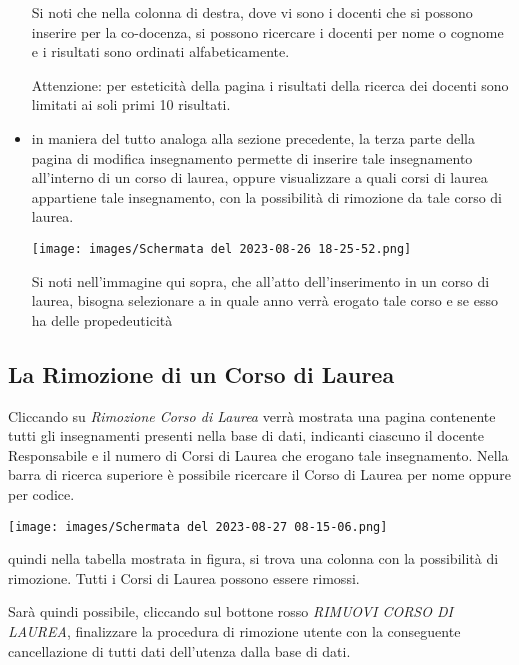 \documentclass{article}
\begin{document}
\begin{itemize}
        Si noti che nella colonna di destra, dove vi sono i docenti che si possono inserire per la co-docenza, si possono ricercare i docenti per nome o cognome e i risultati sono ordinati alfabeticamente.

        Attenzione: per esteticità della pagina i risultati della ricerca dei docenti sono limitati ai soli primi 10 risultati.

        \item in maniera del tutto analoga alla sezione precedente, la terza parte della pagina di modifica insegnamento permette di inserire tale insegnamento all'interno di un corso di laurea, oppure visualizzare a quali corsi di laurea appartiene tale insegnamento, con la possibilità di rimozione da tale corso di laurea.

        \begin{center}
            \texttt{[image: images/Schermata del 2023-08-26 18-25-52.png]}
        \end{center}

        Si noti nell'immagine qui sopra, che all'atto dell'inserimento in un corso di laurea, bisogna selezionare a in quale anno verrà erogato tale corso e se esso ha delle propedeuticità
    \end{itemize}

    \subsection{La Rimozione di un Corso di Laurea}
    Cliccando su \textit{Rimozione Corso di Laurea} verrà mostrata una pagina contenente tutti gli insegnamenti presenti nella base di dati, indicanti ciascuno il docente Responsabile e il numero di Corsi di Laurea che erogano tale insegnamento. Nella barra di ricerca superiore è possibile ricercare il Corso di Laurea per nome oppure per codice.

    \begin{center}
        \texttt{[image: images/Schermata del 2023-08-27 08-15-06.png]}
    \end{center}

    quindi nella tabella mostrata in figura, si trova una colonna con la possibilità di rimozione. Tutti i Corsi di Laurea possono essere rimossi.

    Sarà quindi possibile, cliccando sul bottone rosso \textit{RIMUOVI CORSO DI LAUREA}, finalizzare la procedura di rimozione utente con la conseguente cancellazione di tutti dati dell'utenza dalla base di dati.
\end{document}
